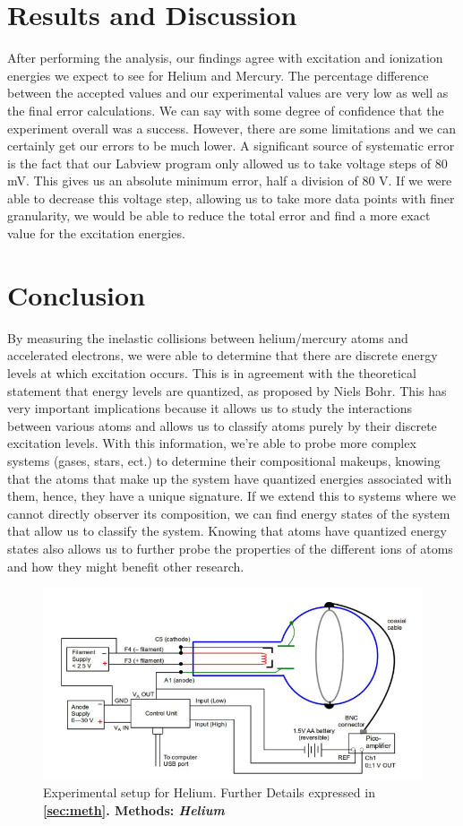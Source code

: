 \documentclass[%
 reprint,
 amsmath,amssymb,
 aps,
]{revtex4-1}
\begin{document}
\section{\label{sec:results}Results and Discussion}
After performing the analysis, our findings agree with excitation and ionization energies we expect to see for Helium and Mercury. The percentage difference between the accepted values and our experimental values are very low as well as the final error calculations. We can say with some degree of confidence that the experiment overall was a success. However, there are some limitations and we can certainly get our errors to be much lower. A significant source of systematic error is the fact that our Labview program only allowed us to take voltage steps of 80 mV. This gives us an absolute minimum error, half a division of 80 V. If we were able to decrease this voltage step, allowing us to take more data points with finer granularity, we would be able to reduce the total error and find a more exact value for the excitation energies. 

\section{\label{sec:results}Conclusion}
By measuring the inelastic collisions between helium/mercury atoms and accelerated electrons, we were able to determine that there are discrete energy levels at which excitation occurs. This is in agreement with the theoretical statement that energy levels are quantized, as proposed by Niels Bohr. This has very important implications because it allows us to study the interactions between various atoms and allows us to classify atoms purely by their discrete excitation levels. With this information, we're able to probe more complex systems (gases, stars, ect.) to determine their compositional makeups, knowing that the atoms that make up the system have quantized energies associated with them, hence, they have a unique signature. If we extend this to systems where we cannot directly observer its composition, we can find energy states of the system that allow us to classify the system. Knowing that atoms have quantized energy states also allows us to further probe the properties of the different ions of atoms and how they might benefit other research.
\begin{figure}[!hb]\centering
\includegraphics[width = \textwidth,keepaspectratio]{heliumb.png}
\caption{Experimental setup for Helium. Further Details expressed in \textbf{\ref{sec:meth}. Methods: \textit{Helium} }}
\label{fig:helb}
\end{figure}
\end{document}
